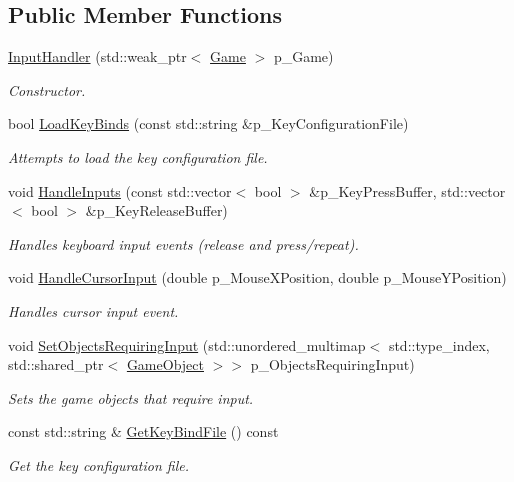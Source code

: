 \subsection*{Public Member Functions}
\begin{DoxyCompactItemize}
\item 
\mbox{\hyperlink{class_input_handler_a304d7d05d09084e7bf16ed93b5c71dc9}{Input\+Handler}} (std\+::weak\+\_\+ptr$<$ \mbox{\hyperlink{class_game}{Game}} $>$ p\+\_\+\+Game)
\begin{DoxyCompactList}\small\item\em Constructor. \end{DoxyCompactList}\item 
bool \mbox{\hyperlink{class_input_handler_a0014003118a5ae9a89dc5c3268bc90eb}{Load\+Key\+Binds}} (const std\+::string \&p\+\_\+\+Key\+Configuration\+File)
\begin{DoxyCompactList}\small\item\em Attempts to load the key configuration file. \end{DoxyCompactList}\item 
void \mbox{\hyperlink{class_input_handler_af78cb28dba7b65f56c6c48949d2c06cf}{Handle\+Inputs}} (const std\+::vector$<$ bool $>$ \&p\+\_\+\+Key\+Press\+Buffer, std\+::vector$<$ bool $>$ \&p\+\_\+\+Key\+Release\+Buffer)
\begin{DoxyCompactList}\small\item\em Handles keyboard input events (release and press/repeat). \end{DoxyCompactList}\item 
void \mbox{\hyperlink{class_input_handler_a8d92172cce174850b2466ffbf536806c}{Handle\+Cursor\+Input}} (double p\+\_\+\+Mouse\+X\+Position, double p\+\_\+\+Mouse\+Y\+Position)
\begin{DoxyCompactList}\small\item\em Handles cursor input event. \end{DoxyCompactList}\item 
void \mbox{\hyperlink{class_input_handler_aca8287951c2ebe1c3c3e7f305f52e076}{Set\+Objects\+Requiring\+Input}} (std\+::unordered\+\_\+multimap$<$ std\+::type\+\_\+index, std\+::shared\+\_\+ptr$<$ \mbox{\hyperlink{class_game_object}{Game\+Object}} $>$$>$ p\+\_\+\+Objects\+Requiring\+Input)
\begin{DoxyCompactList}\small\item\em Sets the game objects that require input. \end{DoxyCompactList}\item 
const std\+::string \& \mbox{\hyperlink{class_input_handler_af157342dcffc46d1370450383304d85a}{Get\+Key\+Bind\+File}} () const
\begin{DoxyCompactList}\small\item\em Get the key configuration file. \end{DoxyCompactList}\end{DoxyCompactItemize}


